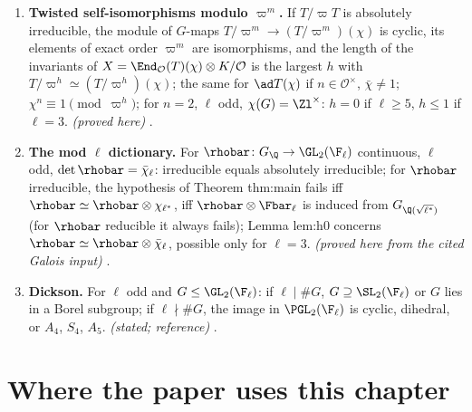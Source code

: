 \begin{enumerate}[label=\textbf{\thechapter.\arabic*}]
irreducible. If $\rhobar^{ss}\simeq\eta_1\oplus\eta_2$, some stable lattice reduces to a
non-split extension with sub-character $\eta_1$ (and one with sub-character $\eta_2$). \emph{(stated; reference)} .
\item \textbf{Twisted self-isomorphisms modulo $\varpi^m$.} If $T/\varpi T$ is absolutely irreducible, the module of $G$-maps
$T/\varpi^m\to(T/\varpi^m)(\chi)$ is cyclic, its elements of exact order $\varpi^m$ are isomorphisms, and the length of the invariants of $X=\End_\mathcal{O}(T)(\chi)\otimes K/\mathcal{O}$ is the
largest $h$ with $T/\varpi^h\simeq(T/\varpi^h)(\chi)$; the same for $\ad T(\chi)$ if $n\in\mathcal{O}^\times$, $\bar\chi\ne1$; $\chi^n\equiv1\pmod{\varpi^h}$; for $n=2$, $\ell$ odd,
$\chi(G)=\Zl^\times$: $h=0$ if $\ell\ge5$, $h\le1$ if $\ell=3$. \emph{(proved here)} .
\item \textbf{The mod $\ell$ dictionary.} For $\rhobar\colon G_\Q\to\GL_2(\F_\ell)$ continuous, $\ell$ odd, $\det\rhobar=\bar\chi_\ell$: irreducible equals
absolutely irreducible; for $\rhobar$ irreducible, the hypothesis of Theorem thm:main fails iff $\rhobar\simeq\rhobar\otimes\chi_{\ell^*}$, iff $\rhobar\otimes\Fbar_\ell$
is induced from $G_{\Q(\sqrt{\ell^*})}$ (for $\rhobar$ reducible it always fails); Lemma lem:h0 concerns $\rhobar\simeq\rhobar\otimes\bar\chi_\ell$, possible only
for $\ell=3$. \emph{(proved here from the cited Galois input)} .
\item \textbf{Dickson.} For $\ell$ odd and $G\le\GL_2(\F_\ell)$: if $\ell\mid\#G$, $G\supseteq\SL_2(\F_\ell)$ or $G$ lies in a Borel subgroup; if $\ell\nmid\#G$, the
image in $\PGL_2(\F_\ell)$ is cyclic, dihedral, or $A_4$, $S_4$, $A_5$. \emph{(stated; reference)} .
\end{enumerate}

\section*{Where the paper uses this chapter}

